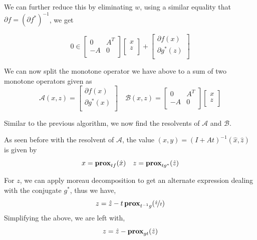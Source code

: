 \documentclass{article}
\theoremstyle{definition}
\theoremstyle{remark}
\begin{document}
We can further reduce this by eliminating $w$, using a similar equality that $\partial f = {(\partial f^*)}^{-1}$, we get

\begin{equation}
  0 \in 
  \begin{bmatrix}
    0 & A^T \\
    -A & 0 \\
  \end{bmatrix}
  \begin{bmatrix}
    x \\
    z \\
  \end{bmatrix}  
  + 
  \begin{bmatrix}
    \partial f(x) \\
    \partial g^*(z) \\
  \end{bmatrix}
\end{equation}


We can now split the monotone operator we have above to a sum of two monotone operators given as 
\begin{equation}
  \mathcal{A}(x, z) = 
  \begin{bmatrix}
    \partial f(x) \\
    \partial g^*(x) \\
  \end{bmatrix}
\quad
\mathcal{B}(x, z) = 
\begin{bmatrix}
  0 & A^T \\
  -A & 0 \\
\end{bmatrix}
\begin{bmatrix}
  x \\
  z \\
\end{bmatrix}
\end{equation}

Similar to the previous algorithm, we now find the resolvents of $\mathcal{A}$ and $\mathcal{B}$. 

As seen before with the resolvent of $\mathcal{A}$, the value $(x, y) = {(I + At)}^{-1}(\hat{x}, \hat{z})$ is given by 
\begin{equation*}
  x = \operatorname{\mathbf{prox}}_{t f}(\hat{x}) \quad z = \operatorname{\mathbf{prox}}_{tg^*}(\hat{z})
\end{equation*}

For $z$, we can apply moreau decomposition to get an alternate expression dealing with the conjugate $g^*$, thus we have, 
\begin{equation*}
  z = \hat{z} - t \operatorname{\mathbf{prox}}_{t^{-1}g}(\nicefrac{\hat{z}}{t})
\end{equation*}
Simplifying the above, we are left with, 
\begin{equation*}
  z = \hat{z} - \operatorname{\mathbf{prox}}_{gt}(\hat{z})
\end{equation*}
\end{document}
